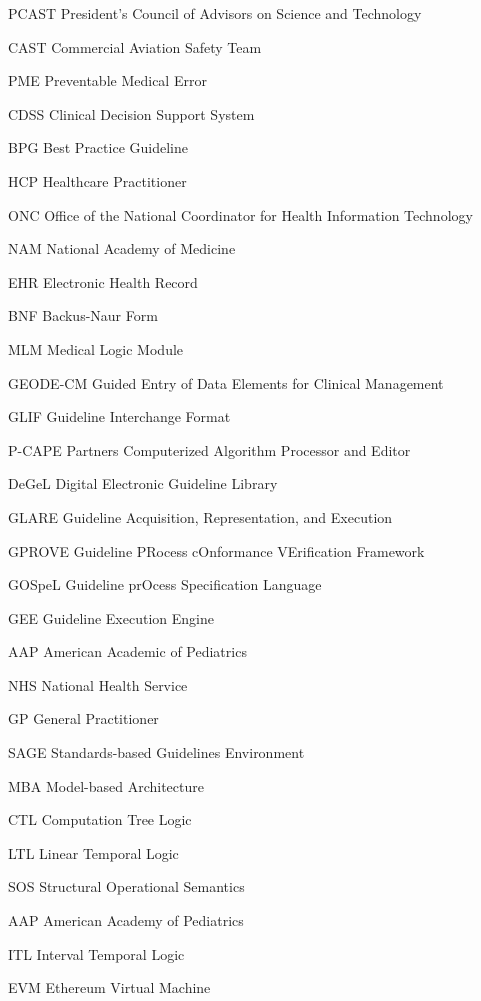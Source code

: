 \documentclass{uiucthesis2021}
\begin{document}
\begin{abbrevlist}
\item[PCAST]    President's Council of Advisors on Science and Technology
\item[CAST]     Commercial Aviation Safety Team
\item[PME]      Preventable Medical Error
\item[CDSS]     Clinical Decision Support System
\item[BPG]      Best Practice Guideline
\item[HCP]      Healthcare Practitioner
\item[ONC]      Office of the National Coordinator for Health Information Technology
\item[NAM]      National Academy of Medicine
\item[EHR]      Electronic Health Record
\item[BNF]      Backus-Naur Form
\item[MLM]      Medical Logic Module
\item[GEODE-CM] Guided Entry of Data Elements for Clinical Management
\item[GLIF]     Guideline Interchange Format
\item[P-CAPE]   Partners Computerized Algorithm Processor and Editor
\item[DeGeL]    Digital Electronic Guideline Library
\item[GLARE]    Guideline Acquisition, Representation, and Execution
\item[GPROVE]   Guideline PRocess cOnformance VErification Framework
\item[GOSpeL]   Guideline prOcess Specification Language
\item[GEE]      Guideline Execution Engine
\item[AAP]      American Academic of Pediatrics
\item[NHS]      National Health Service
\item[GP]       General Practitioner
\item[SAGE]     Standards-based Guidelines Environment
\item[MBA]      Model-based Architecture
\item[CTL]      Computation Tree Logic
\item[LTL]      Linear Temporal Logic
\item[SOS]      Structural Operational Semantics
\item[AAP]      American Academy of Pediatrics
\item[ITL]      Interval Temporal Logic
\item[EVM]      Ethereum Virtual Machine
\end{abbrevlist}
\end{document}
